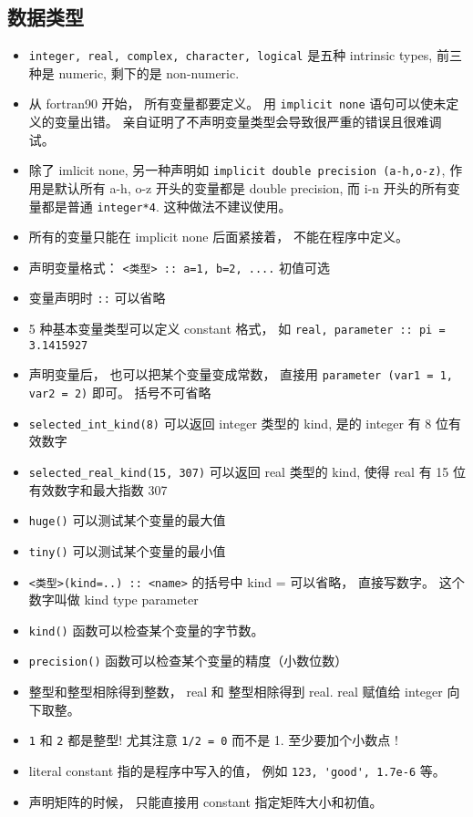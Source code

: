 \subsection{数据类型}
\begin{itemize}
\item \verb`integer, real, complex, character, logical` 是五种 intrinsic types, 前三种是 numeric, 剩下的是 non-numeric.
\item 从 fortran90 开始， 所有变量都要定义。 用 \verb|implicit none| 语句可以使未定义的变量出错。 亲自证明了不声明变量类型会导致很严重的错误且很难调试。
\item 除了 imlicit none, 另一种声明如 \verb|implicit double precision (a-h,o-z)|, 作用是默认所有 a-h, o-z 开头的变量都是 double precision, 而 i-n 开头的所有变量都是普通 \verb|integer*4|. 这种做法不建议使用。
\item 所有的变量只能在 implicit none 后面紧接着， 不能在程序中定义。
\item 声明变量格式：  \verb`<类型> :: a=1, b=2, ....`  初值可选
\item 变量声明时 \verb`::` 可以省略
\item 5 种基本变量类型可以定义 constant 格式， 如  \verb`real, parameter :: pi = 3.1415927`
\item 声明变量后， 也可以把某个变量变成常数， 直接用 \verb|parameter (var1 = 1, var2 = 2)| 即可。 括号不可省略
\item \verb`selected_int_kind(8)` 可以返回 integer 类型的 kind, 是的 integer 有 8 位有效数字
\item \verb`selected_real_kind(15, 307)` 可以返回 real 类型的 kind, 使得 real 有 15 位有效数字和最大指数 307
\item \verb`huge()` 可以测试某个变量的最大值
\item \verb`tiny()` 可以测试某个变量的最小值
\item \verb`<类型>(kind=..) :: <name>` 的括号中 kind = 可以省略， 直接写数字。 这个数字叫做 kind type parameter
\item \verb`kind()` 函数可以检查某个变量的字节数。
\item \verb`precision()` 函数可以检查某个变量的精度（小数位数）
\item 整型和整型相除得到整数， real 和 整型相除得到 real. real 赋值给 integer 向下取整。
\item \verb`1` 和 \verb`2` 都是整型! 尤其注意 \verb`1/2 = 0` 而不是 1.   至少要加个小数点 !
\item literal constant 指的是程序中写入的值， 例如 \verb`123, 'good', 1.7e-6` 等。
\item 声明矩阵的时候， 只能直接用 constant 指定矩阵大小和初值。
\end{itemize}

